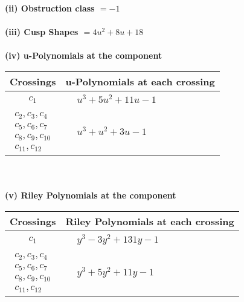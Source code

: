 \documentclass[1p]{elsarticle_modified}
\theoremstyle{definition}
\begin{document}
\flushleft \textbf{(ii) Obstruction class $= -1$}\\~\\
\flushleft \textbf{(iii) Cusp Shapes $= 4 u^2+8 u+18$}\\~\\
\newpage\renewcommand{\arraystretch}{1}
\flushleft \textbf{(iv) u-Polynomials at the component}\newline \\
\begin{tabular}{m{50pt}|m{274pt}}
Crossings & \hspace{64pt}u-Polynomials at each crossing \\
\hline $$\begin{aligned}c_{1}\end{aligned}$$&$\begin{aligned}
&u^3+5 u^2+11 u-1
\end{aligned}$\\
\hline $$\begin{aligned}c_{2},c_{3},c_{4}\\c_{5},c_{6},c_{7}\\c_{8},c_{9},c_{10}\\c_{11},c_{12}\end{aligned}$$&$\begin{aligned}
&u^3+u^2+3 u-1
\end{aligned}$\\
\hline
\end{tabular}\\~\\
\newpage\renewcommand{\arraystretch}{1}
\flushleft \textbf{(v) Riley Polynomials at the component}\newline \\
\begin{tabular}{m{50pt}|m{274pt}}
Crossings & \hspace{64pt}Riley Polynomials at each crossing \\
\hline $$\begin{aligned}c_{1}\end{aligned}$$&$\begin{aligned}
&y^3-3 y^2+131 y-1
\end{aligned}$\\
\hline $$\begin{aligned}c_{2},c_{3},c_{4}\\c_{5},c_{6},c_{7}\\c_{8},c_{9},c_{10}\\c_{11},c_{12}\end{aligned}$$&$\begin{aligned}
&y^3+5 y^2+11 y-1
\end{aligned}$\\
\hline
\end{tabular}\\~\\
\end{document}
